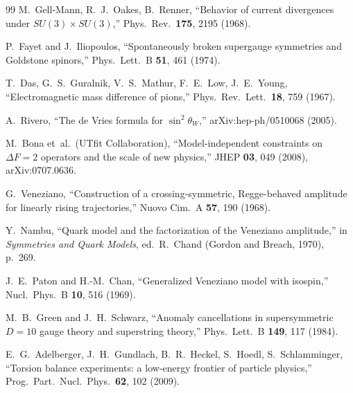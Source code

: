 \documentclass[12pt,a4paper]{article}
\begin{document}
\begin{thebibliography}{99}
M.~Gell-Mann, R.~J.~Oakes, B.~Renner, ``Behavior of current
divergences under $SU(3) \times SU(3)$,''
Phys.\ Rev.\ \textbf{175}, 2195 (1968).

P.~Fayet and J.~Iliopoulos, ``Spontaneously broken supergauge
symmetries and Goldstone spinors,'' Phys.\ Lett.\ B \textbf{51},
461 (1974).

T.~Das, G.~S.~Guralnik, V.~S.~Mathur, F.~E.~Low, J.~E.~Young,
``Electromagnetic mass difference of pions,''
Phys.\ Rev.\ Lett.\ \textbf{18}, 759 (1967).

A.~Rivero, ``The de Vries formula for $\sin^2\theta_W$,''
arXiv:hep-ph/0510068 (2005).

M.~Bona et~al.\ (UTfit Collaboration), ``Model-independent
constraints on $\Delta F = 2$ operators and the scale of new
physics,'' JHEP \textbf{03}, 049 (2008),
arXiv:0707.0636.

G.~Veneziano, ``Construction of a crossing-symmetric, Regge-behaved
amplitude for linearly rising trajectories,''
Nuovo Cim.\ A \textbf{57}, 190 (1968).

Y.~Nambu, ``Quark model and the factorization of the Veneziano
amplitude,'' in \textit{Symmetries and Quark Models},
ed.\ R.~Chand (Gordon and Breach, 1970), p.~269.

J.~E.~Paton and H.-M.~Chan, ``Generalized Veneziano model with
isospin,'' Nucl.\ Phys.\ B \textbf{10}, 516 (1969).

M.~B.~Green and J.~H.~Schwarz, ``Anomaly cancellations in
supersymmetric $D=10$ gauge theory and superstring theory,''
Phys.\ Lett.\ B \textbf{149}, 117 (1984).

E.~G.~Adelberger, J.~H.~Gundlach, B.~R.~Heckel, S.~Hoedl,
S.~Schlamminger, ``Torsion balance experiments: a low-energy
frontier of particle physics,'' Prog.\ Part.\ Nucl.\ Phys.\
\textbf{62}, 102 (2009).

\end{thebibliography}
\end{document}
